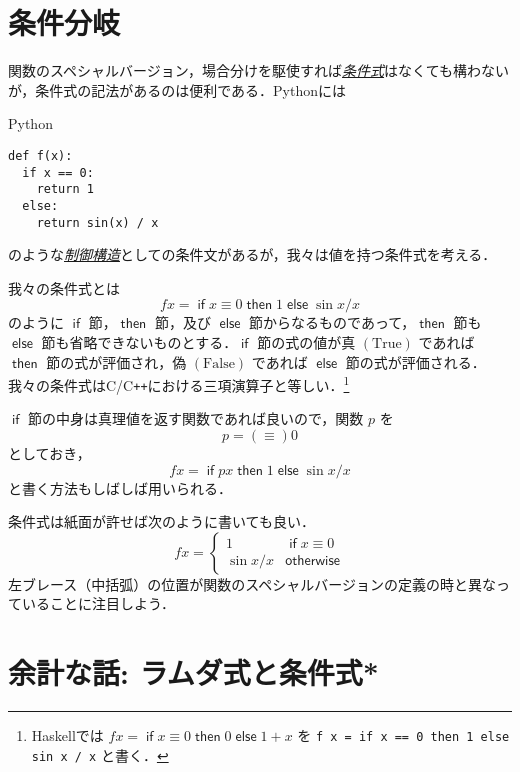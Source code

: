 \documentclass[a4paper,draft]{jsbook}
\newcommand{\programminglanguage}[1]{\textsf{#1}}
\newcommand{\clang}{\programminglanguage{C}}
\newcommand{\cxx}{\programminglanguage{C}\texttt{++}}
\newcommand{\haskell}{\programminglanguage{Haskell}}
\newcommand{\python}{\programminglanguage{Python}}
\newcommand{\keyword}[1]{{\underline{\emph{#1}}}}
\newcommand{\code}[1]{\texttt{#1}}
\newenvironment{pythoncode}{\begin{itembox}[r]{\python}}{\end{itembox}}
\newcommand{\mSpecialConst}[1]{\mathrm{#1}} %
\newcommand{\mTrue}{\mSpecialConst{True}}
\newcommand{\mFalse}{\mSpecialConst{False}}
\newcommand{\mKeyword}[1]{\mathsf{#1}}
\newcommand{\mIfKeyword}{\mKeyword{if}}
\newcommand{\mOtherwiseKeyword}{\mKeyword{otherwise}}
\newcommand{\mThenKeyword}{\mKeyword{then}}
\newcommand{\mElseKeyword}{\mKeyword{else}}
\DeclareMathOperator{\mIf}{\mIfKeyword}
\DeclareMathOperator{\mOtherwise}{\mOtherwiseKeyword}
\DeclareMathOperator{\mThen}{\mThenKeyword}
\DeclareMathOperator{\mElse}{\mElseKeyword}
\newcommand{\mIfThenElse}[3]{\mIf{#1}\mThen{#2}\mElse{#3}}
\begin{document}
\section{条件分岐}
\label{sec:if}

関数のスペシャルバージョン，場合分けを駆使すれば\keyword{条件式}はなくても構わないが，条件式の記法があるのは便利である．\python には
\begin{pythoncode}
\begin{verbatim}
def f(x):
  if x == 0:
    return 1
  else:
    return sin(x) / x
\end{verbatim}
\end{pythoncode}
のような\keyword{制御構造}としての条件文があるが，我々は値を持つ条件式を考える．

我々の条件式とは
\begin{equation}
fx
=\mIfThenElse{x\equiv0}{1}{\sin x/x}
\end{equation}
のように $\mIf$ 節，$\mThen$ 節，及び $\mElse$ 節からなるものであって，$\mThen$ 節も $\mElse$ 節も省略できないものとする．$\mIf$ 節の式の値が真 $(\mTrue)$ であれば $\mThen$ 節の式が評価され，偽 $(\mFalse)$ であれば $\mElse$ 節の式が評価される．我々の条件式は\clang/\cxx における三項演算子と等しい．\footnote{\haskell では $fx=\mIfThenElse{x\equiv0}{0}{1+x}$ を \code{f x = if x == 0 then 1 else sin x / x} と書く．}

$\mIf$ 節の中身は真理値を返す関数であれば良いので，関数 $p$ を
\begin{equation}
p=(\equiv)0
\end{equation}
としておき，
\begin{equation}
fx=\mIfThenElse{px}{1}{\sin x/x}
\end{equation}
と書く方法もしばしば用いられる．

条件式は紙面が許せば次のように書いても良い．
\begin{equation}
fx=\begin{cases}
1&\mIf x\equiv0\\
\sin x/x&\mOtherwise
\end{cases}
\end{equation}
左ブレース（中括弧）の位置が関数のスペシャルバージョンの定義の時と異なっていることに注目しよう．

\section{余計な話: ラムダ式と条件式*}
\end{document}
